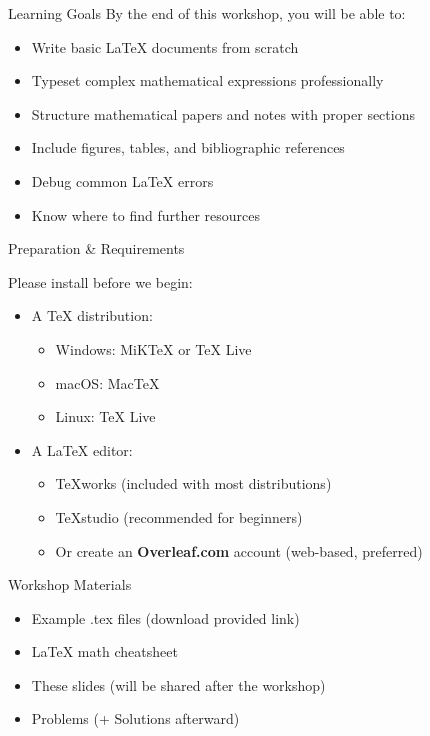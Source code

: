 \begin{frame}{Learning Goals}
	By the end of this workshop, you will be able to:
	\begin{itemize}
		\item Write basic LaTeX documents from scratch
		\item Typeset complex mathematical expressions professionally
		\item Structure mathematical papers and notes with proper sections
		\item Include figures, tables, and bibliographic references
		\item Debug common LaTeX errors
		\item Know where to find further resources
	\end{itemize}
\end{frame}

\begin{frame}{Preparation \& Requirements}
	\begin{block}{Please install before we begin:}
		\begin{itemize}
			\item A TeX distribution:
			\begin{itemize}
				\item Windows: MiKTeX or TeX Live
				\item macOS: MacTeX
				\item Linux: TeX Live
			\end{itemize}
			\item A LaTeX editor:
			\begin{itemize}
				\item TeXworks (included with most distributions)
				\item TeXstudio (recommended for beginners)
				\item Or create an \textbf{Overleaf.com} account (web-based, preferred)
			\end{itemize}
		\end{itemize}
	\end{block}
	
	\begin{alertblock}{Workshop Materials}
		\begin{itemize}
			\item Example .tex files (download provided link)
			\item LaTeX math cheatsheet
			\item These slides (will be shared after the workshop)
			\item Problems (+ Solutions afterward)
		\end{itemize}
	\end{alertblock}
\end{frame}
